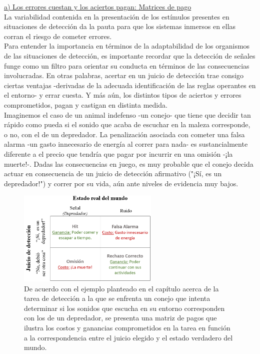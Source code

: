       \underline{a) Los errores cuestan y los aciertos pagan: Matrices de pago}\\

La variabilidad contenida en la presentación de los estímulos presentes en situaciones de detección da la pauta para que los sistemas inmersos en ellas corran el riesgo de cometer errores.\\

Para entender la importancia en términos de la adaptabilidad de los organismos de las situaciones de detección, es importante recordar que la detección de señales funge como un filtro para orientar su conducta en términos de las consecuencias involucradas. En otras palabras, acertar en un juicio de detección trae consigo ciertas ventajas -derivadas de la adecuada identificación de las reglas operantes en el entorno- y errar cuesta. Y más aún, los distintos tipos de aciertos y errores comprometidos, pagan y castigan en distinta medida.\\

Imaginemos el caso de un animal indefenso -un conejo- que tiene que decidir tan rápido como pueda si el sonido que acaba de escuchar en la maleza corresponde, o no, con el de un depredador. La penalización asociada con cometer una falsa alarma -un gasto innecesario de energía al correr para nada- es sustancialmente diferente a el precio que tendría que pagar por incurrir en una omisión -¡la muerte!-. Dadas las consecuencias en juego, es muy probable que el conejo decida actuar en consecuencia de un juicio de detección afirmativo ("¡Sí, es un depredador!") y correr por su vida, aún ante niveles de evidencia muy bajos.\\

\begin{figure}[th]
\centering
\includegraphics[width=0.60\textwidth]{Figures/Matriz_Pagos} 
\caption[Ejemplo de Matriz de Pagos]{De acuerdo con el ejemplo planteado en el capítulo acerca de la tarea de detección a la que se enfrenta un conejo que intenta determinar si los sonidos que escucha en su entorno corresponden con los de un depredador, se presenta una matriz de pagos que ilustra los costos y ganancias comprometidos en la tarea en función a la correspondencia entre el juicio elegido y el estado verdadero del mundo.}
\label{fig:Mat_Pagos}
\end{figure}

